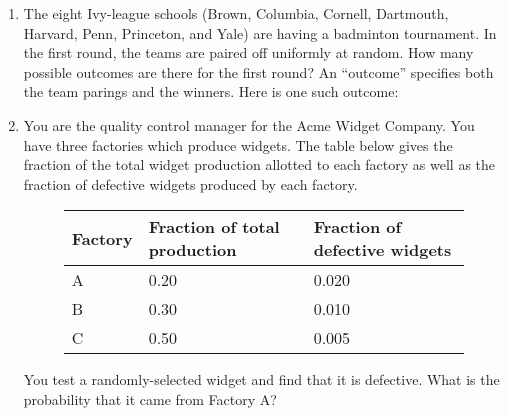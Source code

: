 \documentclass[12pt]{article}
\begin{document}
\begin{enumerate}
\item The eight Ivy-league schools (Brown, Columbia, Cornell, Dartmouth, Harvard, Penn, Princeton, and Yale) are having a badminton tournament. In the first round, the teams are paired off uniformly at random. How many possible outcomes are there for the first round? An ``outcome'' specifies both the team parings and the winners. Here is one such outcome:
\begin{figure}[H]
\centering
{}
\end{figure}

\item You are the quality control manager for the Acme Widget Company. You have three factories which produce widgets. The table below gives the fraction of the total widget production allotted to each factory as well as the fraction of defective widgets produced by each factory.

\begin{figure}[H]
\centering
\begin{tabular}{lll}
\toprule
Factory & Fraction of total production & Fraction of defective widgets \\
\midrule
A & 0.20 & 0.020 \\
B & 0.30 & 0.010 \\
C & 0.50 & 0.005 \\
\bottomrule
\end{tabular}
\end{figure}
You test a randomly-selected widget and find that it is defective. What is the probability that it came from Factory A?

\end{enumerate}
\end{document}
